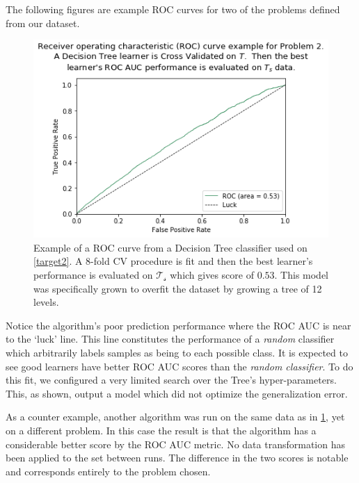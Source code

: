 The following figures are example ROC curves for two of the problems defined from our dataset.


\begin{figure}[h!]
\begin{center}
\includegraphics[width=1\columnwidth]{figures/figure-lowROCAUC/figure-lowROCAUC_original}
\caption{Example of a ROC curve from a Decision Tree classifier used on \cref{target2}. A 8-fold CV procedure is fit and then the best learner's performance is evaluated on $\mathcal{T_s}$ which gives score of $0.53$. This model was specifically grown to overfit the dataset by growing a tree of 12 levels.}
\label{fg:lowROCAUC}
\end{center}
\end{figure}

Notice the algorithm's poor prediction performance where the ROC AUC is near to the `luck' line.
This line constitutes the performance of a \textit{random} classifier which arbitrarily labels samples as being to each possible class.
It is expected to see good learners have better ROC AUC scores than the \textit{random classifier}.
To do this fit, we configured a very limited search over the Tree's hyper-parameters.
This, as shown, output a model which did not optimize the generalization error.


As a counter example, another algorithm was run on the same data as in \cref{fg:lowROCAUC}, yet on a different problem.
In this case the result is that the algorithm has a considerable better score by the ROC AUC metric.
No data transformation has been applied to the set between runs.
The difference in the two scores is notable and corresponds entirely to the problem chosen.

